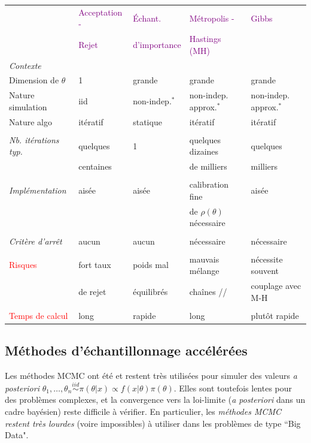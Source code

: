 \begin{tabular}{l|l|l|l|l}
          & \textcolor{purple}{Acceptation -} & \textcolor{purple}{\'Echant.} & \textcolor{purple}{Métropolis -} & \textcolor{purple}{Gibbs}  \\
          & \textcolor{purple}{Rejet}         & \textcolor{purple}{d'importance} & \textcolor{purple}{Hastings (MH)}  &  \\
\hline
\emph{Contexte}  & &&& \\
\cline{1-1}
Dimension de $\theta$ & 1 & grande & grande & grande \\
Nature simulation  & iid  & non-indep.$^*$ & non-indep. approx.$^*$ & non-indep. approx.$^*$ \\
Nature algo & itératif          & statique   & itératif & itératif \\ 
& &&& \\
\emph{Nb. itérations typ.} & quelques       & 1 & quelques dizaines  & quelques \\
                                      & centaines      &   & de milliers        & milliers \\
& &&& \\
\emph{Implémentation} & aisée & aisée & calibration fine & aisée \\
                                 &       &       & de $\rho(\theta)$  nécessaire & \\
& &&& \\
\emph{Critère d'arrêt} & aucun & aucun   & nécessaire   & nécessaire \\
& &&& \\
\textcolor{red}{Risques} & fort taux  & poids mal   & mauvais mélange   & nécessite souvent \\
            & de rejet                     &  équilibrés           &   chaînes //                       & couplage avec M-H \\
& &&& \\
\textcolor{red}{Temps de calcul} & long & rapide & long & plut\^ot rapide \\
\hline
\end{tabular}

\clearpage
\subsection{Méthodes d'échantillonnage accélérées}

Les méthodes MCMC ont été et restent très utilisées pour simuler des valeurs {\it a posteriori} $\theta_1,\ldots,\theta_n \overset{iid}{\sim} \pi(\theta|x)\propto f(x|\theta)\pi(\theta)$. Elles sont toutefois lentes pour des problèmes complexes, et la convergence vers la loi-limite ({\it a posteriori} dans un cadre bayésien) reste difficile à vérifier. En particulier, les \emph{méthodes MCMC restent très lourdes} (voire impossibles) à utiliser dans les problèmes de type ``Big Data". \\

